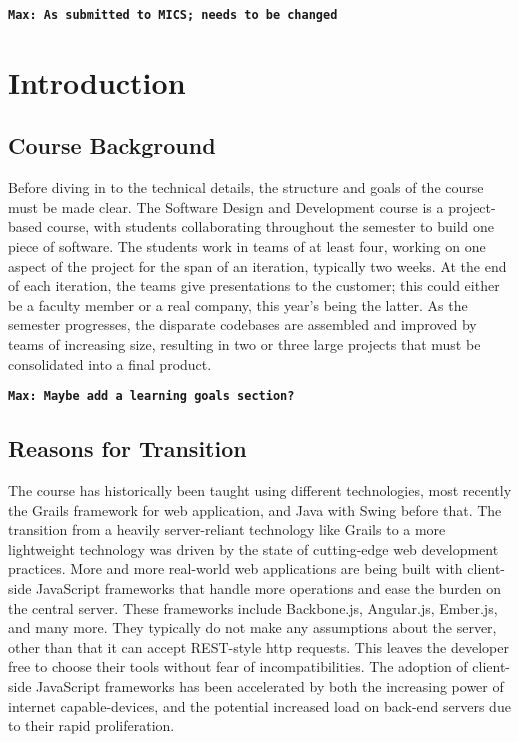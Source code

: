 \documentclass[12pt]{article}
\newcommand{\comment}[1]{{\bf \tt  {#1}}}
\newcommand{\mmcomment}[1]{\textcolor{MaxBlue}{\comment{Max: {#1}}}}
\begin{document}
\mmcomment{As submitted to MICS; needs to be changed}



\setcounter{page}{1}


\section{Introduction}\label{sec:introduction}
\subsection{Course Background}\label{sec:course_background}
Before diving in to the technical details, the structure and goals of the course must be made clear. The Software Design and Development course is a project-based course, with students collaborating throughout the semester to build one piece of software. The students work in teams of at least four, working on one aspect of the project for the span of an iteration, typically two weeks. At the end of each iteration, the teams give presentations to the customer; this could either be a faculty member or a real company, this year's being the latter. As the semester progresses, the disparate codebases are assembled and improved by teams of increasing size, resulting in two or three large projects that must be consolidated into a final product.

\mmcomment{Maybe add a learning goals section?}

\subsection{Reasons for Transition}\label{sec:reasons_for_transition}
The course has historically been taught using different technologies, most recently the Grails framework for web application, and Java with Swing before that. The transition from a heavily server-reliant technology like Grails to a more lightweight technology was driven by the state of cutting-edge web development practices. More and more real-world web applications are being built with client-side JavaScript frameworks that handle more operations and ease the burden on the central server. These frameworks include Backbone.js, Angular.js, Ember.js, and many more. They typically do not make any assumptions about the server, other than that it can accept REST-style http requests. This leaves the developer free to choose their tools without fear of incompatibilities. The adoption of client-side JavaScript frameworks has been accelerated by both the increasing power of internet capable-devices, and the potential increased load on back-end servers due to their rapid proliferation.
\end{document}
